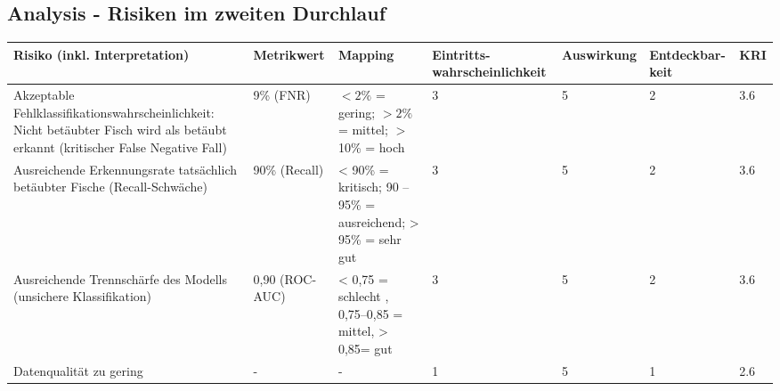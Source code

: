 \begin{landscape}
    \subsection{Analysis - Risiken im zweiten Durchlauf} 
    \label{appendix:cs3_kri_mapping_2}
    \begin{table}[H]
        \label{tab:cs3_phase3_kri_mapping_tabelle_2}
        \centering
        \renewcommand{\arraystretch}{1.3}
        \begin{tabular}{|p{5cm} | p{2.5cm} | p{3cm} | p{3.5cm} | p{3cm} | p{2.5cm} | p{1.5cm} |}
        \hline
        \textbf{Risiko (inkl. Interpretation)} & \textbf{Metrikwert} & \textbf{Mapping} & \textbf{Eintritts-wahrscheinlichkeit} & \textbf{Auswirkung} & \textbf{Entdeckbar-keit} & \textbf{KRI} \\
        \hline

        Akzeptable Fehlklassifikationswahrscheinlichkeit: Nicht betäubter Fisch wird als betäubt erkannt (kritischer False Negative Fall) 
        & 9\% (FNR) 
        & $<2\%$ = gering; $>2\%$ = mittel; $>$10\% = hoch 
        & 3 
        & 5 
        & 2 
        & 3.6 \\
        \hline

        Ausreichende Erkennungsrate tatsächlich betäubter Fische (Recall-Schwäche)
        & 90\% (Recall) 
        & < 90\% = kritisch; 90 -- 95\% = ausreichend; > 95\% = sehr gut
        & 3 
        & 5 
        & 2 
        & 3.6 \\
        \hline

        Ausreichende Trennschärfe des Modells (unsichere Klassifikation)
        & 0{,}90 (ROC-AUC) 
        & < 0{,}75 = schlecht , 0{,}75--0{,}85 = mittel, > 0{,}85= gut
        & 3 
        & 5 
        & 2 
        & 3.6 \\
        \hline

        Datenqualität zu gering
        & - 
        & -
        & 1 
        & 5 
        & 1
        & 2.6 \\
        \hline

        \hline
        \end{tabular}
    \end{table}
\end{landscape}

\clearpage %
\newpage

